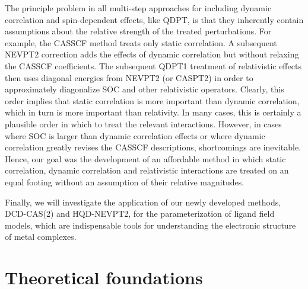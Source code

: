 The principle problem in all multi-step approaches for including dynamic correlation and spin-dependent effects, like QDPT, is that they inherently contain assumptions about the relative strength of the treated perturbations. For example, the CASSCF method treats only static correlation. A subsequent NEVPT2 correction adds the effects of dynamic correlation but without relaxing the CASSCF coefficients. The subsequent QDPT1 treatment of relativistic effects then uses diagonal energies from NEVPT2 (or CASPT2) in order to approximately diagonalize SOC and other relativistic operators. Clearly, this order implies that static correlation is more important than dynamic correlation, which in turn is more important than relativity. In many cases, this is certainly a plausible order in which to treat the relevant interactions. However, in cases where SOC is larger than dynamic correlation effects or where dynamic correlation greatly revises the CASSCF descriptions, shortcomings are inevitable.
Hence, our goal was the development of an affordable method in which static correlation, dynamic correlation and relativistic interactions are treated on an equal footing without an assumption of their relative magnitudes.

Finally, we will investigate the application of our newly developed methods, DCD-CAS(2) and HQD-NEVPT2, for the parameterization of ligand field models, which are indispensable tools for understanding the electronic structure of metal complexes.

\chapter{Theoretical foundations}
